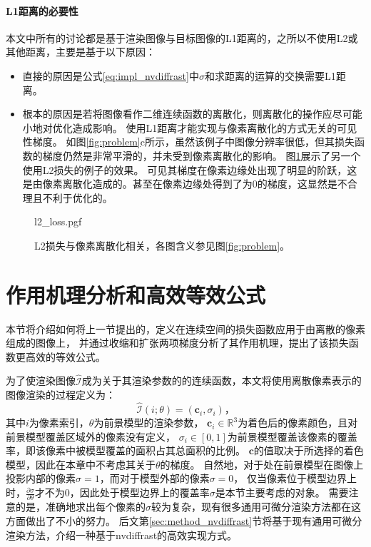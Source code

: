 \paragraph{L1距离的必要性}
本文中所有的讨论都是基于渲染图像与目标图像的L1距离的，之所以不使用L2或其他距离，主要是基于以下原因：
\begin{itemize}
\item 直接的原因是公式\eqref{eq:impl_nvdiffrast}中$\sigma$和求距离的运算的交换需要L1距离。
\item 根本的原因是若将图像看作二维连续函数的离散化，则离散化的操作应尽可能小地对优化造成影响。
使用L1距离才能实现与像素离散化的方式无关的可见性梯度。
如图\ref{fig:problem}c所示，虽然该例子中图像分辨率很低，但其损失函数的梯度仍然是非常平滑的，并未受到像素离散化的影响。
图\ref{fig:l2_loss}展示了另一个使用L2损失的例子的效果。
可见其梯度在像素边缘处出现了明显的阶跃，这是由像素离散化造成的。甚至在像素边缘处得到了为0的梯度，这显然是不合理且不利于优化的。
\end{itemize}

\begin{figure}
    \centering
    {l2_loss.pgf}
    \caption[L2损失与像素离散化相关]{L2损失与像素离散化相关，各图含义参见图\ref{fig:problem}。}
    \label{fig:l2_loss}
\end{figure}

\section{作用机理分析和高效等效公式}

本节将介绍如何将上一节提出的，定义在连续空间的损失函数应用于由离散的像素组成的图像上，
并通过收缩和扩张两项梯度分析了其作用机理，提出了该损失函数更高效的等效公式。

为了使渲染图像$\hat{\mathcal{I}}$成为关于其渲染参数的的连续函数，本文将使用离散像素表示的图像渲染的过程定义为：
\begin{equation}
\hat{\mathcal{I}}(i;\theta) = (\mathbf{c}_i, \sigma_i)
\text{，}
\label{eq:rendering}
\end{equation}
其中$i$为像素索引，$\theta$为前景模型的渲染参数，
$\mathbf{c}_i\in\mathbb{R}^3$为着色后的像素颜色，且对前景模型覆盖区域外的像素没有定义，
$\sigma_i\in[0,1]$为前景模型覆盖该像素的覆盖率，即该像素中被模型覆盖的面积占其总面积的比例。
$\mathbf{c}$的值取决于所选择的着色模型，因此在本章中不考虑其关于$\theta$的梯度。
自然地，对于处在前景模型在图像上投影内部的像素$\sigma=1$，而对于模型外部的像素$\sigma=0$，
仅当像素位于模型边界上时，$\frac{\partial\sigma}{\partial\theta}$才不为0，因此处于模型边界上的覆盖率$\sigma$是本节主要考虑的对象。
需要注意的是，准确地求出每个像素的$\sigma$较为复杂，现有很多通用可微分渲染方法都在这方面做出了不小的努力。
后文第\ref{sec:method_nvdiffrast}节将基于现有通用可微分渲染方法，介绍一种基于nvdiffrast的高效实现方式。

